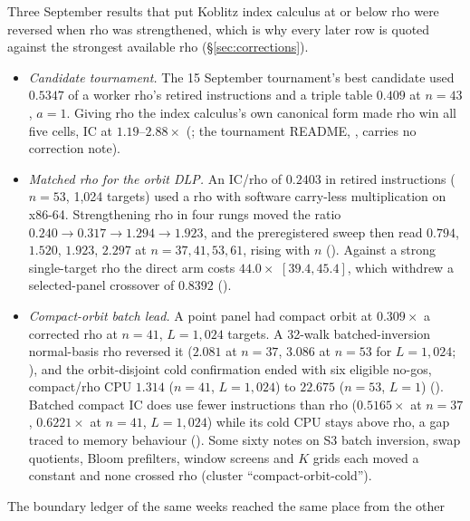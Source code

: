 Three September results that put Koblitz index calculus at or below rho
were reversed when rho was strengthened, which is why every later row is
quoted against the strongest available rho
(\S\ref{sec:corrections}).
\begin{itemize}
\item \emph{Candidate tournament.} The 15 September tournament's best
  candidate used $0.5347$ of a worker rho's retired instructions and a
  triple table $0.409$ at $n=43$, $a=1$. Giving rho the index calculus's own
  canonical form made rho win all five cells, IC at $1.19$--$2.88\times$
  (; the tournament README,
  , carries no correction
  note).
\item \emph{Matched rho for the orbit DLP.} An IC/rho of $0.2403$ in
  retired instructions ($n=53$, 1{,}024 targets) used a rho with software
  carry-less multiplication on x86-64. Strengthening rho in four rungs moved
  the ratio $0.240\to0.317\to1.294\to1.923$, and the preregistered sweep
  then read $0.794$, $1.520$, $1.923$, $2.297$ at $n=37,41,53,61$, rising
  with $n$ ().
  Against a strong single-target rho the direct arm costs $44.0\times$
  $[39.4,45.4]$, which withdrew a selected-panel crossover of $0.8392$
  ().
\item \emph{Compact-orbit batch lead.} A point panel had compact orbit at
  $0.309\times$ a corrected rho at $n=41$, $L=1{,}024$ targets. A 32-walk
  batched-inversion normal-basis rho reversed it ($2.081$ at $n=37$,
  $3.086$ at $n=53$ for $L=1{,}024$;
  ),
  and the orbit-disjoint cold confirmation ended with six eligible no-gos,
  compact/rho CPU $1.314$ ($n=41$, $L=1{,}024$) to $22.675$ ($n=53$, $L=1$)
  ().
  Batched compact IC does use fewer instructions than rho
  ($0.5165\times$ at $n=37$, $0.6221\times$ at $n=41$, $L=1{,}024$) while
  its cold CPU stays above rho, a gap traced to memory behaviour
  ().
  Some sixty notes on S3 batch inversion, swap quotients, Bloom
  prefilters, window screens and $K$ grids each moved a constant and none
  crossed rho (cluster ``compact-orbit-cold'').
\end{itemize}
The boundary ledger of the same weeks reached the same place from the other
